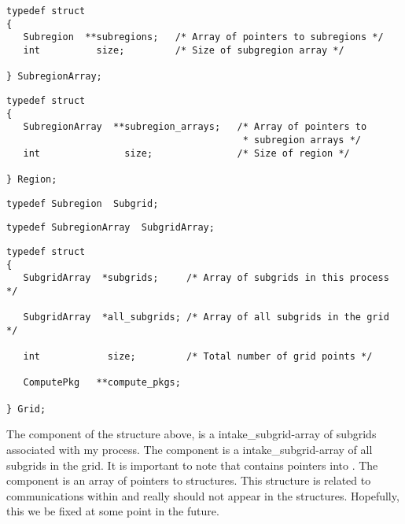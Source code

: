 \begin{display}\begin{verbatim}
typedef struct
{
   Subregion  **subregions;   /* Array of pointers to subregions */
   int          size;         /* Size of subgregion array */

} SubregionArray;
\end{verbatim}\end{display}

\begin{display}\begin{verbatim}
typedef struct
{
   SubregionArray  **subregion_arrays;   /* Array of pointers to
                                          * subregion arrays */
   int               size;               /* Size of region */

} Region;
\end{verbatim}\end{display}

\begin{display}\begin{verbatim}
typedef Subregion  Subgrid;
\end{verbatim}\end{display}

\begin{display}\begin{verbatim}
typedef SubregionArray  SubgridArray;
\end{verbatim}\end{display}

\begin{display}\begin{verbatim}
typedef struct
{
   SubgridArray  *subgrids;     /* Array of subgrids in this process */

   SubgridArray  *all_subgrids; /* Array of all subgrids in the grid */

   int            size;         /* Total number of grid points */

   ComputePkg   **compute_pkgs;

} Grid;
\end{verbatim}\end{display}

The  component of the  structure above, is a
intake_subgrid-array of subgrids associated with my process.
The  component is a intake_subgrid-array of all subgrids
in the grid.
It is important to note that  contains pointers into
.
The  component is an array of pointers to
 structures.
This structure is related to communications within \parflow{} and
really should not appear in the  structures.
Hopefully, this we be fixed at some point in the future.

